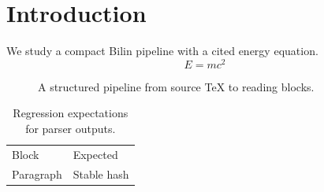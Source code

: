 \documentclass{article}
\begin{document}
\section{Introduction}
We study a compact Bilin pipeline with a cited energy equation.
\begin{equation}
\label{eq:energy}
E=mc^2
\end{equation}
\begin{figure}
\caption{A structured pipeline from source TeX to reading blocks.}
\label{fig:pipeline}
\end{figure}
\begin{table}
\caption{Regression expectations for parser outputs.}
\label{tab:results}
\begin{tabular}{ll}
Block & Expected \\
Paragraph & Stable hash \\
\end{tabular}
\end{table}
\end{document}
